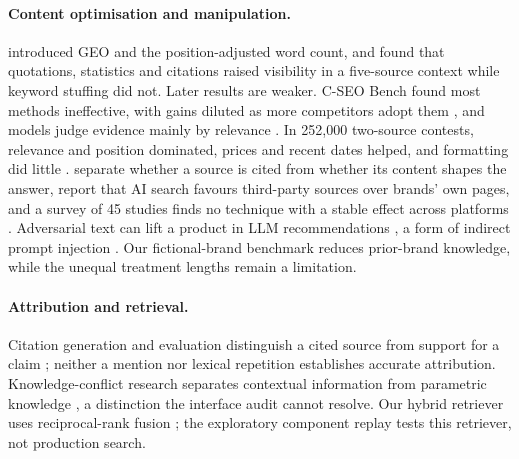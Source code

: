 \documentclass[11pt]{article}
\begin{document}
\paragraph{Content optimisation and manipulation.}
\citet{aggarwal2024geo} introduced GEO and the position-adjusted word count, and found that quotations, statistics and
citations raised visibility in a five-source context while keyword stuffing did not. Later results are weaker. C-SEO
Bench found most methods ineffective, with gains diluted as more competitors adopt them \citep{puerto2025cseo}, and
models judge evidence mainly by relevance \citep{wan2024evidence}. In 252{,}000 two-source contests, relevance and
position dominated, prices and recent dates helped, and formatting did little \citep{vishwakarma2026cited}.
\citet{zhang2026absorption} separate whether a source is cited from whether its content shapes the answer,
\citet{chen2025dominate} report that AI search favours third-party sources over brands' own pages, and a survey of 45
studies finds no technique with a stable effect across platforms \citep{martinez2026survey}. Adversarial text can lift
a product in LLM recommendations \citep{kumar2024manipulating,pfrommer2024ranking,nestaas2025adversarial}, a form of
indirect prompt injection \citep{greshake2023indirect}. Our fictional-brand benchmark reduces prior-brand knowledge, while the unequal treatment lengths remain a limitation.

\paragraph{Attribution and retrieval.} Citation generation and evaluation distinguish a cited source from support
for a claim \citep{gao2023citations,rashkin2023attribution}; neither a mention nor lexical repetition establishes
accurate attribution. Knowledge-conflict research separates contextual information from parametric knowledge
\citep{xu2024conflicts}, a distinction the interface audit cannot resolve. Our hybrid retriever uses reciprocal-rank
fusion \citep{cormack2009rrf}; the exploratory component replay tests this retriever, not production search.
\end{document}
